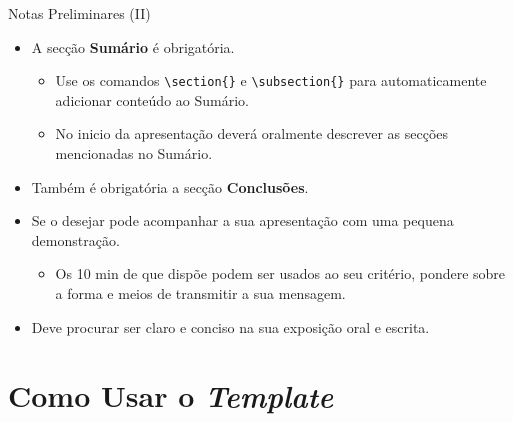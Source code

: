 \documentclass[
aspectratio=169,	%
LEEC,				%
portuguese,			%
]{DEEclassP}
\begin{document}
\begin{frame}[fragile]{Notas Preliminares (II)}

\setlstep{0.3cm}{0cm}{0cm}
\begin{itemize}
	\item A secção \textbf{Sumário} é obrigatória.
	\begin{itemize}
		\item Use os comandos \verb|\section{}| e \verb|\subsection{}| para automaticamente adicionar conteúdo ao Sumário.
		\item No inicio da apresentação deverá oralmente descrever as secções mencionadas no Sumário.
	\end{itemize}	
	\item Também é obrigatória a secção \textbf{Conclusões}.
	\item Se o desejar pode acompanhar a sua apresentação com uma pequena demonstração. 
	\begin{itemize}
		\item Os 10 min de que dispõe podem ser usados ao seu critério, pondere sobre a forma e meios de transmitir a sua mensagem.
	\end{itemize}
	\item Deve procurar ser claro e conciso na sua exposição oral e escrita.
\end{itemize}
\end{frame}

\section{Como Usar o \textit{Template}}
\end{document}
